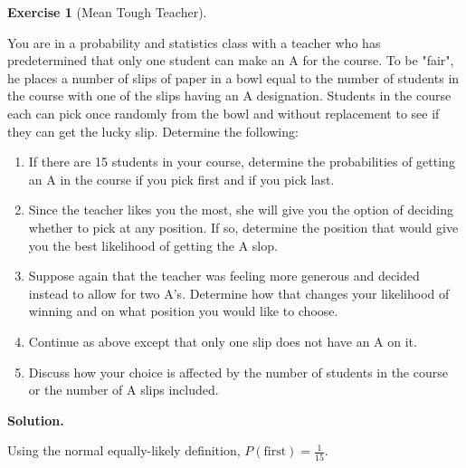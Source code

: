 \documentclass[10pt,]{book}
\theoremstyle{plain}
\theoremstyle{definition}
\theoremstyle{definition}
\theoremstyle{definition}
\newtheorem{exercise}[theorem]{Exercise}
\numberwithin{equation}{section}
\begin{document}
\begin{exercise}[{Mean Tough Teacher}]\label{exercise-19}

	You are in a probability and statistics class with a teacher who has predetermined that only one student can make an A for the course. To be "fair", he places a number of slips of paper in a bowl equal to the number of students in the course with one of the slips having an A designation. Students in the course each can pick once randomly from the bowl and without replacement to see if they can get the lucky slip.  Determine the following:
	\leavevmode%
\begin{enumerate}
\item\hypertarget{li-124}{}If there are 15 students in your course, determine the probabilities of getting an A in the course if you pick first and if you pick last.%
\item\hypertarget{li-125}{}Since the teacher likes you the most, she will give you the option of deciding whether to pick at any position. If so, determine the position that would give you the best likelihood of getting the A slop.%
\item\hypertarget{li-126}{}Suppose again that the teacher was feeling more generous and decided instead to allow for two A's. Determine how that changes your likelihood of winning and on what position you would like to choose.%
\item\hypertarget{li-127}{}Continue as above except that only one slip does not have an A on it.%
\item\hypertarget{li-128}{}Discuss how your choice is affected by the number of students in the course or the number of A slips included.%
\end{enumerate}

\par\smallskip
\noindent\textbf{Solution.}\hypertarget{solution-4}{}\quad

	Using the normal equally-likely definition, \(P(\text{first}) = \frac{1}{15}\).
\par


\end{exercise}
\end{document}
